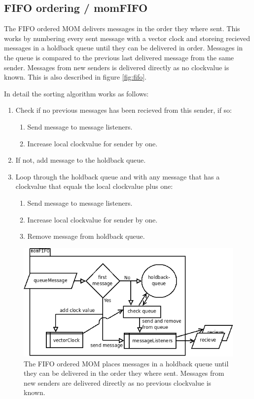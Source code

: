 \documentclass[english]{article}
\begin{document}
\subsection{FIFO ordering / momFIFO}
\label{mo-fifo}
The FIFO ordered MOM delivers messages in the order they where sent. This works by numbering every sent message with a vector clock and storeing recieved messages in a holdback queue until they can be delivered in order. Messages in the queue is compared to the previous last delivered message from the same sender. Messages from new senders is delivered directly as no clockvalue is known. This is also described in figure \vref{fig:fifo}.

In detail the sorting algorithm works as follows:
\begin{enumerate}
\item Check if no previous messages has been recieved from this sender, if so:
	\begin{enumerate}
	\item Send message to message listeners.
	\item Increase local clockvalue for sender by one.
	\end{enumerate}
\item If not, add message to the holdback queue.
\item Loop through the holdback queue and with any message that has a clockvalue that equals the local clockvalue plus one:
	\begin{enumerate}
	\item Send message to message listeners.
	\item Increase local clockvalue for sender by one.
	\item Remove message from holdback queue.
	\end{enumerate}
\end{enumerate}

\begin{figure}
\includegraphics[width=\textwidth]{momFIFO.png}
\caption{The FIFO ordered MOM places messages in a holdback queue until they can be delivered in the order they where sent. Messages from new senders are delivered directly as no previous clockvalue is known.}
\label{fig:fifo}
\end{figure}
\end{document}
